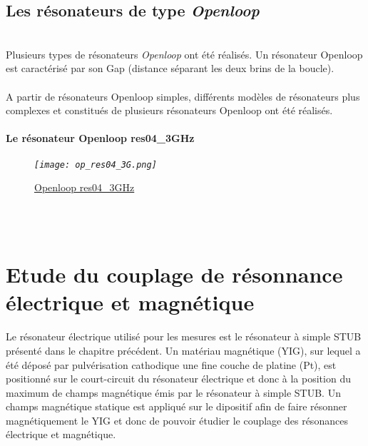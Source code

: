 \documentclass[12pt,fleqn]{book} %
\begin{document}
\section{Les résonateurs de type \emph{Openloop}}
~\\\indent Plusieurs types de résonateurs \emph{Openloop} ont été réalisés. Un résonateur Openloop est caractérisé par son Gap (distance séparant les deux brins de la boucle). 
~\\\\A partir de résonateurs Openloop simples, différents modèles de résonateurs plus complexes et constitués de plusieurs résonateurs Openloop ont été réalisés. 
~\\
\subsubsection{Le résonateur Openloop res04\_3GHz}
\begin{figure}[H]
	\centering
	\itshape
	\texttt{[image: op\_res04\_3G.png]}
	\caption{\label{op_res04_3G} \underline{Openloop res04\_3GHz}}
\end{figure}
\noindent 

~\\\\
\chapter{Etude du couplage de résonnance électrique et magnétique}
Le résonateur électrique utilisé pour les mesures est le résonateur à simple STUB présenté dans le chapitre précédent. Un matériau magnétique (YIG), sur lequel a été déposé par pulvérisation cathodique une fine couche de platine (Pt), est positionné sur le court-circuit du résonateur électrique et donc à la position du maximum de champs magnétique émis par le résonateur à simple STUB. Un champs magnétique statique est appliqué sur le dipositif afin de faire résonner magnétiquement le YIG et donc de pouvoir étudier le couplage des résonances électrique et magnétique.
\end{document}
